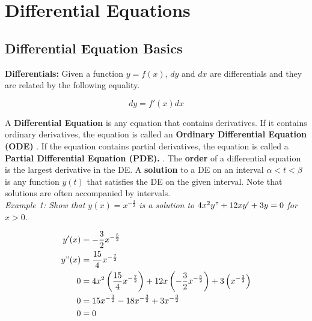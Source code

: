 \section{Differential Equations}

    \subsection{Differential Equation Basics}
        \color{purple} \textbf{Differentials:} \color{black} Given a function $y=f(x)$,
        $dy$ and $dx$ are differentials and they are related by the following equality.

        \begin{equation*}
            dy = f'(x)dx
        \end{equation*}

        \noindent A \color{purple} \textbf{Differential Equation} \color{black} is any equation
        that contains derivatives. If it contains ordinary derivatives, the equation is called
        an \color{purple} \textbf{Ordinary Differential Equation (ODE)} \color{black}. If the
        equation contains partial derivatives, the equation is called a \color{purple}
        \textbf{Partial Differential Equation (PDE).} \color{black} . The \color{purple}
        \textbf{order} \color{black} of a differential equation is the largest derivative in the
        DE. A \color{purple} \textbf{solution} \color{black} to a DE on an interval
        $\alpha<t<\beta$ is any function $y(t)$ that satisfies the DE on the given interval.
        Note that solutions are often accompanied by intervals. \\

        \noindent \color{blue} \textit{Example 1: Show that $y(x)=x^{-\frac{3}{2}}$ is a solution
        to $4x^2 y" + 12xy'+3y=0$ for $x>0$.} \color{black}

        \begin{align*}
            y'(x)   &= -\frac{3}{2}x^{-\frac{5}{2}} \\
            y"(x)   &= \frac{15}{4}x^{-\frac{7}{2}} \\
            0       &= 4x^2\left(\frac{15}{4}x^{-\frac{7}{2}}\right)
                    + 12x\left(-\frac{3}{2}x^{-\frac{5}{2}}\right)
                    + 3\left(x^{-\frac{3}{2}}\right) \\
            0       &= 15x^{-\frac{3}{2}} - 18x^{-\frac{3}{2}} + 3x^{-\frac{3}{2}} \\
            0       &= 0
        \end{align*}

